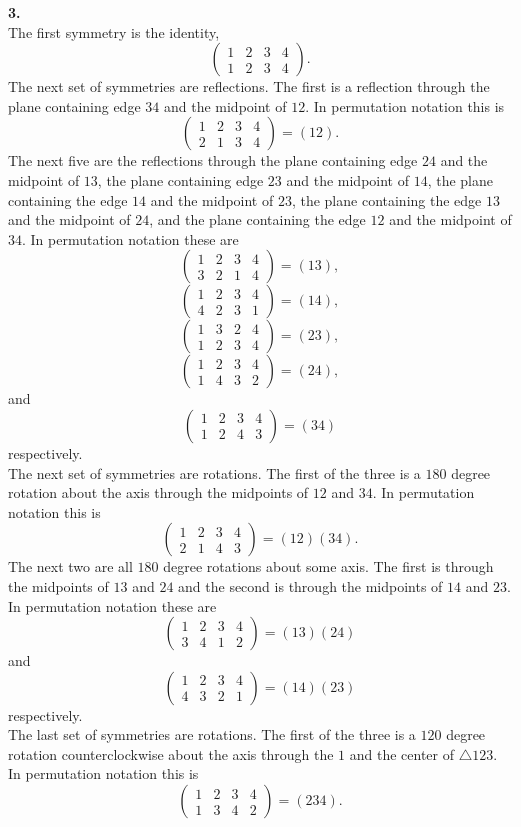 \documentclass[11pt,a4paper]{article}
\begin{document}
{\bf 3.}\\
The first symmetry is the identity, \[\begin{pmatrix}1&2&3&4\\1&2&3&4\end{pmatrix}.\] The next set of symmetries are reflections. The first is a reflection through the plane containing edge $34$ and the midpoint of $12$. In permutation notation this is \[\begin{pmatrix}1&2&3&4\\2&1&3&4\end{pmatrix} = (12).\] The next five are the reflections through the plane containing edge $24$ and the midpoint of $13$, the plane containing edge $23$ and the midpoint of $14$, the plane containing the edge $14$ and the midpoint of $23$, the plane containing the edge $13$ and the midpoint of $24$, and the plane containing the edge $12$ and the midpoint of $34$. In permutation notation these are \[\begin{pmatrix}1&2&3&4\\3&2&1&4\end{pmatrix} = (13),\] \[\begin{pmatrix}1&2&3&4\\4&2&3&1\end{pmatrix} = (14),\] \[\begin{pmatrix}1&3&2&4\\1&2&3&4\end{pmatrix} = (23),\] \[\begin{pmatrix}1&2&3&4\\1&4&3&2\end{pmatrix} = (24),\] and \[\begin{pmatrix}1&2&3&4\\1&2&4&3\end{pmatrix} = (34)\]
respectively.\\
The next set of symmetries are rotations. The first of the three is a $180$ degree rotation about the axis through the midpoints of $12$ and $34$. In permutation notation this is \[\begin{pmatrix}1&2&3&4\\2&1&4&3\end{pmatrix} = (12)(34).\] The next two are all $180$ degree rotations about some axis. The first is through the midpoints of $13$ and $24$ and the second is through the midpoints of $14$ and $23$. In permutation notation these are \[\begin{pmatrix}1&2&3&4\\3&4&1&2\end{pmatrix} = (13)(24)\] and
\[\begin{pmatrix}1&2&3&4\\4&3&2&1\end{pmatrix} = (14)(23)\] respectively.\\
The last set of symmetries are rotations. The first of the three is a $120$ degree rotation counterclockwise about the axis through the $1$ and the center of $\triangle 123$. In permutation notation this is \[\begin{pmatrix}1&2&3&4\\1&3&4&2\end{pmatrix} = (234).\] 
\end{document}
